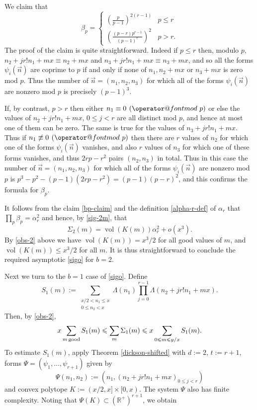 \documentclass[12pt]{amsart}
\makeatletter
\numberwithin{equation}{section}  %
\theoremstyle{remark}
\theoremstyle{plain}
\numberwithin{equation}{section}
\newcommand{\R}{\mathbb{R}}
\renewcommand{\pmod}[1]{\allowbreak\mkern7mu({\operator@font mod}\,\,#1)}
\renewcommand{\le}{\leqslant}
\renewcommand{\leq}{\leqslant}
\renewcommand{\(}{\left(}
\renewcommand{\)}{\right)}
\newcommand{\pfrac}[2]{\left(\frac{#1}{#2}\right)}  %
\newcommand{\vect}[1]{{\ensuremath{\vec{#1}}}}
\newcommand{\vol}{\operatorname{vol}}
\makeatother
\begin{document}
We claim that
\begin{equation}\label{bp-claim} \beta_p = \left\{ \begin{array}{ll} (\frac{p}{p-1})^{2(r - 1)} & p \leq r \\ \pfrac{(p-r)p^{r-1}}{(p-1)^r}^2 & p > r.\end{array}  \right. \end{equation}
The proof of the claim is quite straightforward. Indeed if $p \leq r$ then, modulo $p$, $n_2 + jr! n_1 + mx \equiv n_2 + mx$ and $n_3 + jr! n_1 + mx \equiv n_3 + mx$, and so all the forms $\psi_i(\vect{n})$ are coprime to $p$ if and only if none of $n_1,n_
2 + mx$ or $n_3 + mx$ is zero mod $p$. Thus the number of $\vect{n} = (n_1, n_2,n_3)$ for which all of the forms $\psi_i(\vect{n})$ are nonzero mod $p$ is precisely $(p-1)^3$.

If, by contrast, $p > r$ then either $n_1 \equiv 0 \pmod{p}$ or else the values of $n_2+ jr! n_1 + mx$, $0 \leq j < r$ are all distinct mod $p$, and hence at most one of them can be zero. The same is true for the values of $n_3 + jr! n_1 + mx$. Thus if $n_
1 \not\equiv 0 \pmod{p}$ then there are $r$ values of $n_2$ for which one of the forms $\psi_i(\vect{n})$ vanishes, and also $r$ values of $n_3$ for which one of these forms vanishes, and thus $2rp - r^2$ pairs $(n_2,n_3)$ in total. Thus in this case the number of $\vect{n} = (n_1, n_2,n_3)$ for which all of the forms $\psi_i(\vect{n})$ are nonzero mod $p$ is $p^3 - p^2 - (p-1)(2rp - r^2) = (p-1)(p-r)^2$, and this confirms the formula for $\beta_p$.

It follows from the claim \eqref{bp-claim} and the definition \eqref{alpha-r-def} of $\alpha_r$ that $\prod_p \beta_p = \alpha_r^2$ and hence, by \eqref{sig-2m}, that
\[ \Sigma_2(m) = \vol(K(m)) \alpha_r^2 + o(x^3).\]
By \eqref{obs-2} above we have $\vol(K(m)) = x^3/2$ for all good values of $m$, and $\vol(K(m)) \leq x^3/2$ for all $m$. It is thus straightforward to conclude the required asymptotic \eqref{sigo} for $b=2$.

Next we turn to the $b=1$ case of \eqref{sigo}. Define
\[ S_1(m) := \sum_{\substack{x/2 < n_1 \le x \\ 0 \leq n_2 < x}}\Lambda(n_1) \prod_{j = 0}^{r-1} \Lambda(n_2 + jr! n_1 + mx).\] Then, by \eqref{obs-2},
\begin{equation}\label{sigma2-s2} x \sum_{m\, \mbox{\scriptsize good}} S_1(m) \leq \sum_m \Sigma_1(m) \leq x\sum_{0 \leq m \leq y/x} S_1(m).\end{equation}
 To estimate $S_1(m)$, apply Theorem \ref{dickson-shifted} with $d := 2$, $t := r+1$, forms $\Psi = (\psi_1,\dots, \psi_{r+1})$ given by
\[ \Psi(n_1,n_2) := (n_1,(n_2 + jr! n_1 + mx)_{0 \leq j < r})\] and convex polytope $K := (x/2, x] \times [0,x)$. The system $\Psi$ also has finite complexity. Noting that $\Psi( K) \subset (\R^{+})^{r+1}$, we obtain
\end{document}
